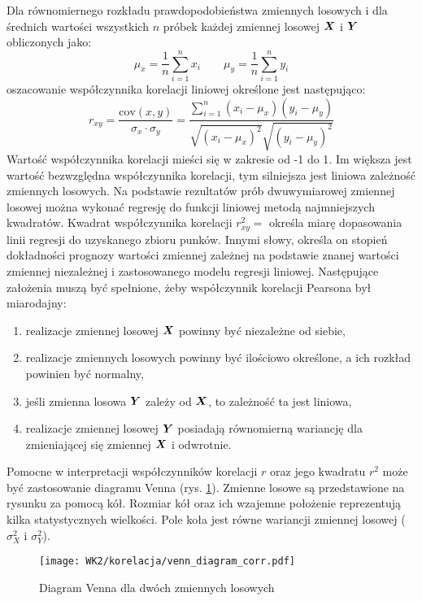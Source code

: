 \begin{appendices}
Dla równomiernego rozkładu prawdopodobieństwa zmiennych losowych i dla średnich wartości wszystkich $n$ próbek każdej zmiennej losowej $\bm{X}$ i $\bm{Y}$ obliczonych jako:
\begin{equation}
\mu_x=\frac{1}{n}\sum_{i=1}^{n}x_i \qquad \mu_y=\frac{1}{n}\sum_{i=1}^{n}y_i
\end{equation}
oszacowanie współczynnika korelacji liniowej określone jest następująco:
\begin{equation}
	r_{xy}=\frac{\mathrm{cov}(x,y)}{\sigma_x\cdot\sigma_y}=\frac{\sum_{i=1}^{n}(x_i-\mu_x)(y_i-\mu_y)}{\sqrt{(x_i-\mu_x)^2}\sqrt{(y_i-\mu_y)^2}}
\end{equation}
Wartość współczynnika korelacji mieści się w zakresie od -1 do 1. Im większa jest wartość bezwzględna współczynnika korelacji, tym silniejsza jest liniowa zależność zmiennych losowych. Na podstawie rezultatów prób dwuwymiarowej zmiennej losowej można wykonać regresję do funkcji liniowej metodą najmniejszych kwadratów. Kwadrat współczynnika korelacji $r_{xy}^2=$ określa miarę dopasowania linii regresji do uzyskanego zbioru punków. Innymi słowy, określa on stopień dokładności prognozy wartości zmiennej zależnej na podstawie znanej wartości zmiennej niezależnej i zastosowanego modelu regresji liniowej. Następujące założenia muszą być spełnione, żeby współczynnik korelacji Pearsona był miarodajny:
\begin{enumerate}
	\item realizacje zmiennej losowej $\bm{X}$ powinny być niezależne od siebie,
	\item realizacje zmiennych losowych powinny być ilościowo określone, a ich rozkład powinien być normalny,
	\item jeśli zmienna losowa $\bm{Y}$ zależy od $\bm{X}$, to zależność ta jest liniowa,
	\item realizacje zmiennej losowej $\bm{Y}$ posiadają równomierną wariancję dla zmieniającej się zmiennej $\bm{X}$ i odwrotnie.
\end{enumerate}

Pomocne w interpretacji współczynników korelacji $r$ oraz jego kwadratu $r^2$ może być zastosowanie diagramu Venna (rys. \ref{fig:venn_diag_corr}). Zmienne losowe są przedstawione na rysunku za pomocą kół. Rozmiar kół oraz ich wzajemne położenie reprezentują kilka statystycznych wielkości. Pole koła jest równe wariancji zmiennej losowej ($\sigma_X^2$ i $\sigma_Y^2$). 

\begin{figure}[hbt!]
	\centering
	\texttt{[image: WK2/korelacja/venn\_diagram\_corr.pdf]}
	\captionsetup{justification=centering}
	\caption{Diagram Venna dla dwóch zmiennych losowych}
	\label{fig:venn_diag_corr}
\end{figure}


\end{appendices}
